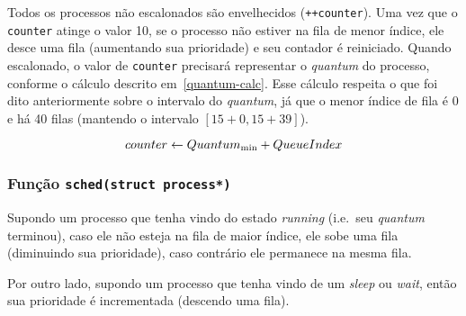 \documentclass{article}
\begin{document}
Todos os processos não escalonados são envelhecidos (\texttt{++counter}). Uma
vez que o \texttt{counter} atinge o valor 10, se o processo não estiver na fila
de menor índice, ele desce uma fila (aumentando sua prioridade) e seu contador
é reiniciado. Quando escalonado, o valor de \texttt{counter} precisará
representar o \textit{quantum} do processo, conforme o cálculo descrito
em~\ref{quantum-calc}. Esse cálculo respeita o que foi dito anteriormente sobre
o intervalo do \textit{quantum}, já que o menor índice de fila é 0 e há 40
filas (mantendo o intervalo $[15 + 0, 15 + 39]$).

\begin{equation}
    counter \leftarrow Quantum_{\min} + QueueIndex\\
    \label{quantum-calc}
\end{equation}

\subsubsection{Função \texttt{sched(struct process*)}}

Supondo um processo que tenha vindo do estado \textit{running} (i.e.\ seu
\textit{quantum} terminou), caso ele não esteja na fila de maior índice, ele
sobe uma fila (diminuindo sua prioridade), caso contrário ele permanece na
mesma fila.

Por outro lado, supondo um processo que tenha vindo de um \textit{sleep} ou
\textit{wait}, então sua prioridade é incrementada (descendo uma fila).
\end{document}
